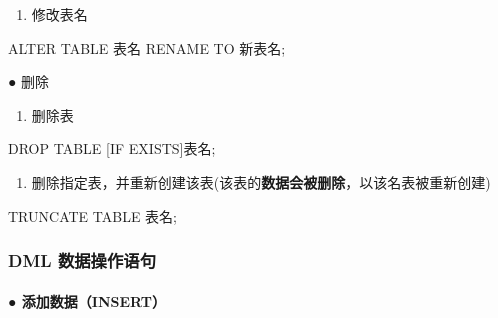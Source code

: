 \documentclass[
  letterpaper,
  DIV=11,
  numbers=noendperiod]{scrreprt}
\let\oldparagraph\paragraph
\renewcommand{\paragraph}[1]{\oldparagraph{#1}\mbox{}}
\newenvironment{Shaded}{\begin{snugshade}}{\end{snugshade}}
\newcommand{\ControlFlowTok}[1]{\textcolor[rgb]{0.00,0.23,0.31}{#1}}
\newcommand{\KeywordTok}[1]{\textcolor[rgb]{0.00,0.23,0.31}{#1}}
\newcommand{\NormalTok}[1]{\textcolor[rgb]{0.00,0.23,0.31}{#1}}
\providecommand{\tightlist}{%
  \setlength{\itemsep}{0pt}\setlength{\parskip}{0pt}}\usepackage{longtable,booktabs,array}
\begin{document}
\begin{enumerate}
\def\labelenumi{\arabic{enumi}.}
\setcounter{enumi}{4}
\tightlist
\item
  修改表名
\end{enumerate}

\begin{Shaded}
\begin{Highlighting}[]
\KeywordTok{ALTER} \KeywordTok{TABLE}\NormalTok{ 表名 }\KeywordTok{RENAME} \KeywordTok{TO}\NormalTok{ 新表名;}
\end{Highlighting}
\end{Shaded}

● 删除

\begin{enumerate}
\def\labelenumi{\arabic{enumi}.}
\tightlist
\item
  删除表
\end{enumerate}

\begin{Shaded}
\begin{Highlighting}[]
\KeywordTok{DROP} \KeywordTok{TABLE}\NormalTok{ [}\ControlFlowTok{IF} \KeywordTok{EXISTS}\NormalTok{]表名;}
\end{Highlighting}
\end{Shaded}

\begin{enumerate}
\def\labelenumi{\arabic{enumi}.}
\setcounter{enumi}{1}
\tightlist
\item
  删除指定表，并重新创建该表(该表的\textbf{数据会被删除}，以该名表被重新创建)
\end{enumerate}

\begin{Shaded}
\begin{Highlighting}[]
\KeywordTok{TRUNCATE} \KeywordTok{TABLE}\NormalTok{ 表名;}
\end{Highlighting}
\end{Shaded}

\hypertarget{dml-ux6570ux636eux64cdux4f5cux8bedux53e5}{%
\subsubsection{DML
数据操作语句}\label{dml-ux6570ux636eux64cdux4f5cux8bedux53e5}}

\hypertarget{ux6dfbux52a0ux6570ux636einsert}{%
\paragraph{● 添加数据（INSERT）}\label{ux6dfbux52a0ux6570ux636einsert}}
\end{document}
